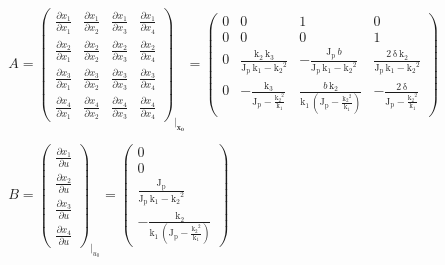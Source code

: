 \documentclass[11pt,a4paper]{article}
\begin{document}
\renewcommand{\arraystretch}{1.3}
{\Large
\begin{align*}
&A = 
\begin{pmatrix}
\frac{\partial x_1}{\partial x_1} & \frac{\partial x_1}{\partial x_2} & \frac{\partial x_1}{\partial x_3} & \frac{\partial x_1}{\partial x_4}	\\
\frac{\partial x_2}{\partial x_1} & \frac{\partial x_2}{\partial x_2} & \frac{\partial x_2}{\partial x_3} & \frac{\partial x_2}{\partial x_4}	\\
\frac{\partial x_3}{\partial x_1} & \frac{\partial x_3}{\partial x_2} & \frac{\partial x_3}{\partial x_3} & \frac{\partial x_3}{\partial x_4}	\\
\frac{\partial x_4}{\partial x_1} & \frac{\partial x_4}{\partial x_2} & \frac{\partial x_4}{\partial x_3} & \frac{\partial x_4}{\partial x_4}
\end{pmatrix}_{\biggr\rvert_\mathbf{x_0}} =
\left(\begin{array}{cccc} 0 & 0 & 1 & 0\\ 0 & 0 & 0 & 1\\ 0 & \frac{\mathrm{k_2}\, \mathrm{k_3}}{\mathrm{J_p}\, \mathrm{k_1} - {\mathrm{k_2}}^2} & -\frac{\mathrm{J_p}\, b}{\mathrm{J_p}\, \mathrm{k_1} - {\mathrm{k_2}}^2} & \frac{2\, \mathrm{\delta}\, \mathrm{k_2}}{\mathrm{J_p}\, \mathrm{k_1} - {\mathrm{k_2}}^2}\\ 0 & -\frac{\mathrm{k_3}}{\mathrm{J_p} - \frac{{\mathrm{k_2}}^2}{\mathrm{k_1}}} & \frac{b\, \mathrm{k_2}}{\mathrm{k_1}\, \left(\mathrm{J_p} - \frac{{\mathrm{k_2}}^2}{\mathrm{k_1}}\right)} & -\frac{2\, \mathrm{\delta}}{\mathrm{J_p} - \frac{{\mathrm{k_2}}^2}{\mathrm{k_1}}} \end{array}\right)	\\ \\
&B =
\begin{pmatrix}
\frac{\partial x_1}{\partial u}	\\
\frac{\partial x_2}{\partial u}	\\
\frac{\partial x_3}{\partial u}	\\
\frac{\partial x_4}{\partial u}
\end{pmatrix}_{\biggr\rvert_{u_0}} =
\left(\begin{array}{c} 0\\ 0\\ \frac{\mathrm{J_p}}{\mathrm{J_p}\, \mathrm{k_1} - {\mathrm{k_2}}^2}\\ -\frac{\mathrm{k_2}}{\mathrm{k_1}\, \left(\mathrm{J_p} - \frac{{\mathrm{k_2}}^2}{\mathrm{k_1}}\right)} \end{array}\right)	\\ \\

\end{align*}}
\end{document}
